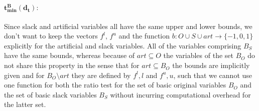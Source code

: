 \documentclass[a4paper]{article}
\begin{document}
\paragraph{$\mathbf{t_{min}^{B}(d_{t}):}$}
Since slack and artificial variables all have the same upper and lower bounds,
we don't want to keep the vectors $f^{l}$, $f^{u}$ and the function
$b: O \cup S \cup art \rightarrow \{-1,0,1\}$ explicitly for the artificial and
slack variables. 
All of the variables comprising $B_{S}$ have the same bounds, whereas because of
$art \subseteq O$ the variables of the set $B_{O}$ do not share this property in
the sense that for $art \subseteq B_{O}$ the bounds are implicitly given and for
$B_{O} \setminus art$ they are defined by $f^{l}, l$ and $f^{u}, u$, such that
we cannot use one function for both the ratio test for the set of basic
original variables $B_{O}$ and the set of basic slack variables $B_{S}$ without
incurring computational overhead for the latter set.
\end{document}
